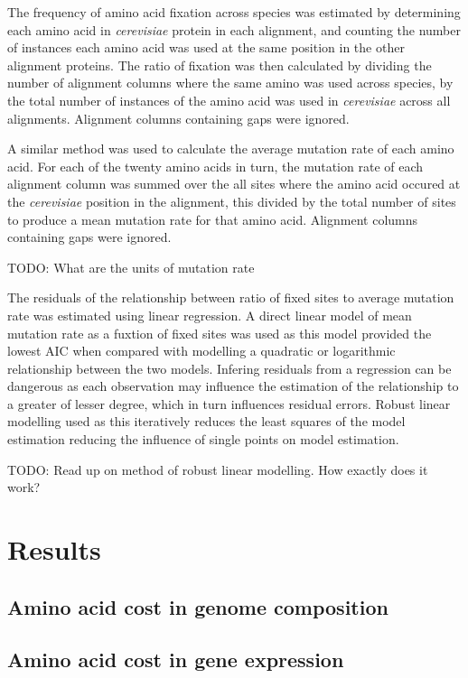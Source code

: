 The frequency of amino acid fixation across species was estimated by determining each amino acid in \emph{cerevisiae} protein in each alignment, and counting the number of instances each amino acid was used at the same position in the other alignment proteins. The ratio of fixation was then calculated by dividing the number of alignment columns where the same amino was used across species, by the total number of instances of the amino acid was used in \emph{cerevisiae} across all alignments. Alignment columns containing gaps were ignored.

A similar method was used to calculate the average mutation rate of each amino acid. For each of the twenty amino acids in turn, the mutation rate of each alignment column was summed over the all sites where the amino acid occured at the \emph{cerevisiae} position in the alignment, this divided by the total number of sites to produce a mean mutation rate for that amino acid. Alignment columns containing gaps were ignored.

TODO: What are the units of mutation rate

The residuals of the relationship between ratio of fixed sites to average mutation rate was estimated using linear regression. A direct linear model of mean mutation rate as a fuxtion of fixed sites was used as this model provided the lowest AIC when compared with modelling a quadratic or logarithmic relationship between the two models. Infering residuals from a regression can be dangerous as each observation may influence the estimation of the relationship to a greater of lesser degree, which in turn influences residual errors. Robust linear modelling used as this iteratively reduces the least squares of the model estimation reducing the influence of single points on model estimation.

TODO: Read up on method of robust linear modelling. How exactly does it work?

\clearpage

\section{Results}

\subsection{Amino acid cost in genome composition}

\subsection{Amino acid cost in gene expression}

